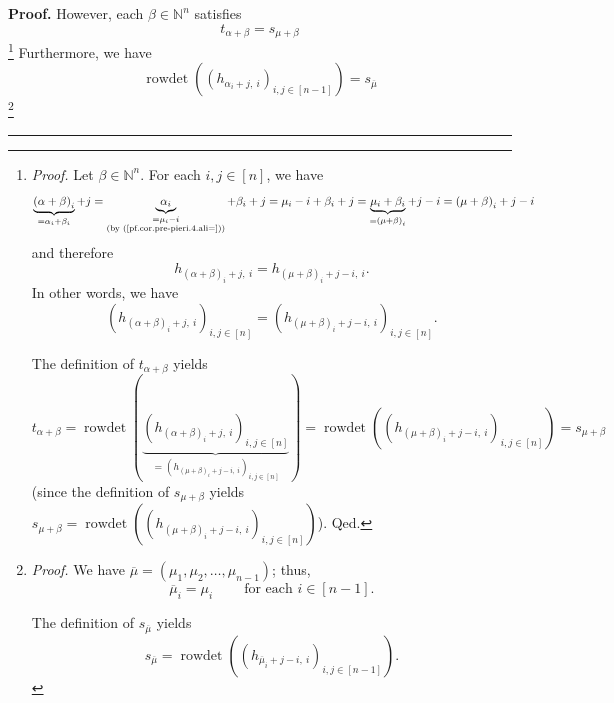\documentclass[numbers=enddot,12pt,final,onecolumn,notitlepage,english]{scrartcl}%
\theoremstyle{definition}
\newenvironment{proof}[1][Proof]{\noindent\textbf{#1.} }{\ \rule{0.5em}{0.5em}}
\newenvironment{verlong}{}{}
\begin{document}
\begin{proof}
\begin{verlong}
However, each $\beta\in\mathbb{N}^{n}$ satisfies
\begin{equation}
t_{\alpha+\beta}=s_{\mu+\beta} \label{pf.cor.pre-pieri.4.3}%
\end{equation}
\footnote{\textit{Proof.} Let $\beta\in\mathbb{N}^{n}$. For each
$i,j\in\left[  n\right]  $, we have%
\[
\underbrace{\left(  \alpha+\beta\right)  _{i}}_{=\alpha_{i}+\beta_{i}%
}+j=\underbrace{\alpha_{i}}_{\substack{=\mu_{i}-i\\\text{(by
(\ref{pf.cor.pre-pieri.4.ali=}))}}}+\beta_{i}+j=\mu_{i}-i+\beta_{i}%
+j=\underbrace{\mu_{i}+\beta_{i}}_{=\left(  \mu+\beta\right)  _{i}%
}+j-i=\left(  \mu+\beta\right)  _{i}+j-i
\]
and therefore
\[
h_{\left(  \alpha+\beta\right)  _{i}+j,\ i}=h_{\left(  \mu+\beta\right)
_{i}+j-i,\ i}.
\]
In other words, we have%
\[
\left(  h_{\left(  \alpha+\beta\right)  _{i}+j,\ i}\right)  _{i,j\in\left[
n\right]  }=\left(  h_{\left(  \mu+\beta\right)  _{i}+j-i,\ i}\right)
_{i,j\in\left[  n\right]  }.
\]
\par
The definition of $t_{\alpha+\beta}$ yields
\[
t_{\alpha+\beta}=\operatorname*{rowdet}\left(  \underbrace{\left(  h_{\left(
\alpha+\beta\right)  _{i}+j,\ i}\right)  _{i,j\in\left[  n\right]  }%
}_{=\left(  h_{\left(  \mu+\beta\right)  _{i}+j-i,\ i}\right)  _{i,j\in\left[
n\right]  }}\right)  =\operatorname*{rowdet}\left(  \left(  h_{\left(
\mu+\beta\right)  _{i}+j-i,\ i}\right)  _{i,j\in\left[  n\right]  }\right)
=s_{\mu+\beta}%
\]
(since the definition of $s_{\mu+\beta}$ yields $s_{\mu+\beta}%
=\operatorname*{rowdet}\left(  \left(  h_{\left(  \mu+\beta\right)
_{i}+j-i,\ i}\right)  _{i,j\in\left[  n\right]  }\right)  $). Qed.}
Furthermore, we have
\begin{equation}
\operatorname*{rowdet}\left(  \left(  h_{\alpha_{i}+j,\ i}\right)
_{i,j\in\left[  n-1\right]  }\right)  =s_{\overline{\mu}}
\label{pf.cor.pre-pieri.4.4}%
\end{equation}
\footnote{\textit{Proof.} We have $\overline{\mu}=\left(  \mu_{1},\mu
_{2},\ldots,\mu_{n-1}\right)  $; thus,
\begin{equation}
\overline{\mu}_{i}=\mu_{i}\ \ \ \ \ \ \ \ \ \ \text{for each }i\in\left[
n-1\right]  . \label{pf.cor.pre-pieri.4.4.pf.1}%
\end{equation}
\par
The definition of $s_{\overline{\mu}}$ yields%
\begin{equation}
s_{\overline{\mu}}=\operatorname*{rowdet}\left(  \left(  h_{\overline{\mu}%
_{i}+j-i,\ i}\right)  _{i,j\in\left[  n-1\right]  }\right)  .

\end{equation}}
\end{verlong}
\end{proof}
\end{document}
